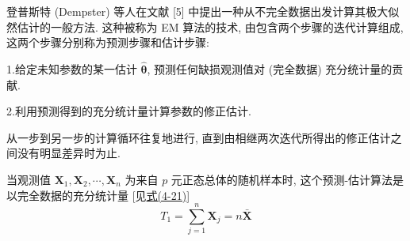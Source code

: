 登普斯特 (Dempster) 等人在文献 [5] 中提出一种从不完全数据出发计算其极大似然估计的一般方法. 这种被称为 EM 算法的技术, 由包含两个步骤的迭代计算组成, 这两个步骤分别称为预测步骤和估计步骤:

1.\quad {}\quad 给定未知参数的某一估计 $\hat{\boldsymbol{\theta}}$, 预测任何缺损观测值对 (完全数据) 充分统计量的贡献.

2.\quad {}\quad 利用预测得到的充分统计量计算参数的修正估计.

从一步到另一步的计算循环往复地进行, 直到由相继两次迭代所得出的修正估计之间没有明显差异时为止.

当观测值 $\mathbf{X}_{1},\mathbf{X}_{2},\cdots,\mathbf{X}_{n}$ 为来自 $p$ 元正态总体的随机样本时, 这个预测-估计算法是以完全数据的充分统计量 [见\hyperref[eq:4-21]{式(4-21)}]
\[
T_{1}=\sum_{j=1}^{n}\mathbf{X}_{j}=n\bar{\mathbf{X}}
\]
